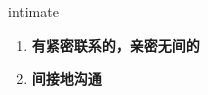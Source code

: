 
\begin{frame}
{\huge intimate}
\begin{center}
\begin{enumerate}\Large
  \item \textbf{有紧密联系的，亲密无间的}
  \item \textbf{间接地沟通}
\end{enumerate}
\end{center}
\end{frame}
